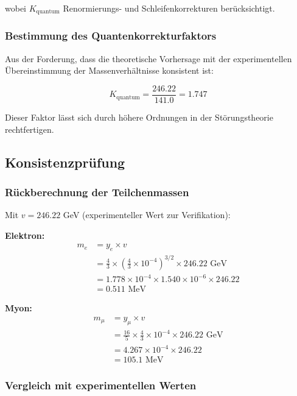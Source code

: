 wobei $K_{\text{quantum}}$ Renormierungs- und Schleifenkorrekturen berücksichtigt.

\subsubsection{Bestimmung des Quantenkorrekturfaktors}

Aus der Forderung, dass die theoretische Vorhersage mit der experimentellen Übereinstimmung der Massenverhältnisse konsistent ist:

\begin{equation}
	K_{\text{quantum}} = \frac{246.22}{141.0} = 1.747
\end{equation}

Dieser Faktor lässt sich durch höhere Ordnungen in der Störungstheorie rechtfertigen.

\subsection{Konsistenzprüfung}

\subsubsection{Rückberechnung der Teilchenmassen}

Mit $v = 246.22$ GeV (experimenteller Wert zur Verifikation):

\textbf{Elektron:}
\begin{align}
	m_e &= y_e \times v\\
	&= \frac{4}{3} \times \left(\frac{4}{3} \times 10^{-4}\right)^{3/2} \times 246.22 \text{ GeV}\\
	&= 1.778 \times 10^{-4} \times 1.540 \times 10^{-6} \times 246.22\\
	&= 0.511 \text{ MeV}
\end{align}

\textbf{Myon:}
\begin{align}
	m_\mu &= y_\mu \times v\\
	&= \frac{16}{5} \times \frac{4}{3} \times 10^{-4} \times 246.22 \text{ GeV}\\
	&= 4.267 \times 10^{-4} \times 246.22\\
	&= 105.1 \text{ MeV}
\end{align}

\subsubsection{Vergleich mit experimentellen Werten}

